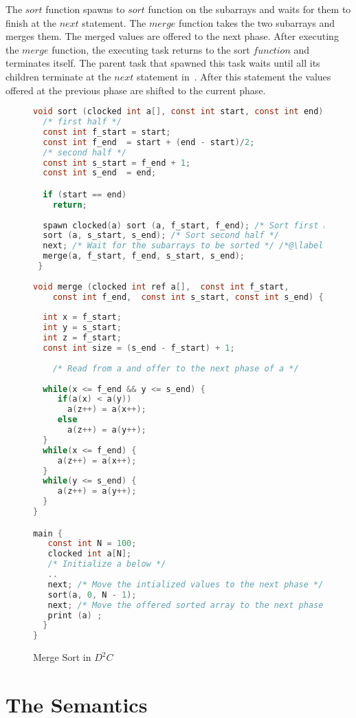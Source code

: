 \documentclass[10pt, conference, compsocconf]{IEEEtran}
\begin{document}
The $sort$ function spawns to $sort$ function on the subarrays
and waits for them to finish at the $next$ statement.
The $merge$ function takes the two subarrays and merges them.
The merged values are offered to the next phase. 
After executing  the $merge$ function, the executing task
 returns to the sort $function$ and terminates
itself.  The parent task that spawned this task waits until all its children
terminate at the $next$ statement in~. After this statement
the values offered at the previous phase are shifted to the current phase.




\begin{figure}[htbp]
\begin{lstlisting}[language=C]
void sort (clocked int a[], const int start, const int end)  {
  /* first half */
  const int f_start = start;
  const int f_end  = start + (end - start)/2;
  /* second half */
  const int s_start = f_end + 1;
  const int s_end  = end;

  if (start == end)
    return;
        	
  spawn clocked(a) sort (a, f_start, f_end); /* Sort first half */ 
  sort (a, s_start, s_end); /* Sort second half */ 
  next; /* Wait for the subarrays to be sorted */ /*@\label{line:next1}@*/;
  merge(a, f_start, f_end, s_start, s_end);
 }
    
void merge (clocked int ref a[],  const int f_start, 
    const int f_end,  const int s_start, const int s_end) {
    	
  int x = f_start;
  int y = s_start;
  int z = f_start;
  const int size = (s_end - f_start) + 1;
  
    /* Read from a and offer to the next phase of a */   
 
  while(x <= f_end && y <= s_end) {
     if(a(x) < a(y))
       a(z++) = a(x++);
     else
       a(z++) = a(y++);
  }
  while(x <= f_end) {
     a(z++) = a(x++);
  }
  while(y <= s_end) {
     a(z++) = a(y++);
  }
}

main {
   const int N = 100;
   clocked int a[N]; 
   /* Initialize a below */
   ..
   next; /* Move the intialized values to the next phase */ 
   sort(a, 0, N - 1);
   next; /* Move the offered sorted array to the next phase */
   print (a) ; 
  }
}
\end{lstlisting}
\caption{Merge Sort in $D^2C$}
\label{fig:mergesort}
\end{figure}
\section{The Semantics}
\label{sec:semantics}
\end{document}
